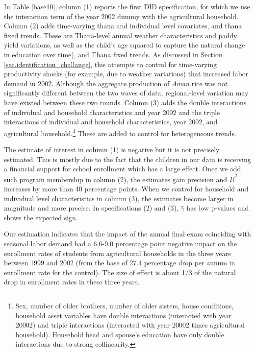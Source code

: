 \documentclass[12pt,letterpaper]{article}
\newcommand{\0}{\ensuremath{\mbox{\boldmath $0$}}}
\begin{document}
In Table \ref{base10}, column (1) reports the first DID specification, for which we use the interaction term of the year 2002 dummy with the agricultural household. Column (2) adds time-varying thana and individual level covariates, and thana fixed trends. These are Thana-level annual weather characteristics and paddy yield variations, as well as the child's age squared to capture the natural change in education over time), and Thana fixed trends. As discussed in Section \ref{sec.identification_challange}, this attempts to control for time-varying productivity shocks (for example, due to weather variations) that increased labor demand in 2002. Although the aggregate production of \textit{Aman} rice was not significantly different between the two waves of data, regional-level variation may have existed between these two rounds. Column (3) adds the double interactions of individual and household characteristics and year 2002 and the triple interactions of individual and household characteristics, year 2002, and agricultural household.\footnote{Sex, number of older brothers, number of older sisters, house conditions, household asset variables have double interactions (interacted with year 20002) and triple interactions (interacted with year 20002 times agricultural household). Household head and spouse's education have only double interactions due to strong collinearity. } These are added to control for heterogeneous trends. 

The estimate of interest in column (1) is negative but it is not precisely estimated. This is mostly due to the fact that the children in our data is receiving a financial support for school enrollment which has a large effect. Once we add such program membership in column (2), the estimates gain precision and $\bar{R}^{2}$ increases by more than 40 percentage points. When we control for household and individual level characteristics in column (3), the estimates become larger in magnitude and more precise. In specifications (2) and (3), $\hat{\gamma}$ has low p-values and shows the expected sign. 



Our estimation indicates that the impact of the annual final exam coinciding with seasonal labor demand had a 6.6-9.0 percentage point negative impact on the enrollment rates of students from agricultural households in the three years between 1999 and 2002 (from the base of 27.4 percentage drop per annum in enrollment rate for the control). The size of effect is about 1/3 of the natural drop in enrollment rates in these three years. 
\end{document}

